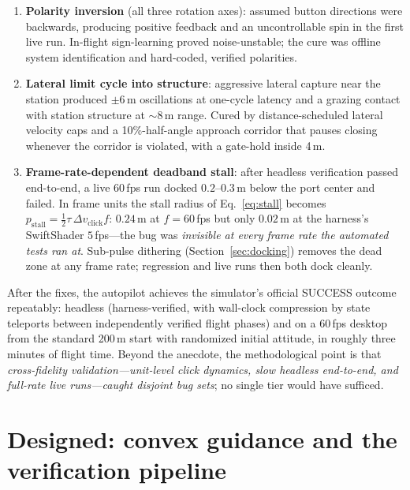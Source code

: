\documentclass[11pt]{article}
\begin{document}
\begin{enumerate}
  \item \textbf{Polarity inversion} (all three rotation axes): assumed
        button directions were backwards, producing positive feedback and
        an uncontrollable spin in the first live run. In-flight
        sign-learning proved noise-unstable; the cure was offline system
        identification and hard-coded, verified polarities.
  \item \textbf{Lateral limit cycle into structure}: aggressive lateral
        capture near the station produced $\pm 6$\,m oscillations at
        one-cycle latency and a grazing contact with station structure at
        $\sim$8\,m range. Cured by distance-scheduled lateral velocity
        caps and a 10\%-half-angle approach corridor that pauses closing
        whenever the corridor is violated, with a gate-hold inside 4\,m.
  \item \textbf{Frame-rate-dependent deadband stall}: after headless
        verification passed end-to-end, a live 60\,fps run docked
        $0.2$--$0.3$\,m below the port center and failed. In frame units
        the stall radius of Eq.~\eqref{eq:stall} becomes
        $p_{\mathrm{stall}} = \tfrac{1}{2}\tau\,\Delta v_{\mathrm{click}} f$:
        $0.24$\,m at $f{=}60$\,fps but only $0.02$\,m at the harness's
        SwiftShader $5$\,fps---the bug was \emph{invisible at every frame
        rate the automated tests ran at}. Sub-pulse dithering
        (Section~\ref{sec:docking}) removes the dead zone at any frame
        rate; regression and live runs then both dock cleanly.
\end{enumerate}

After the fixes, the autopilot achieves the simulator's official SUCCESS
outcome repeatably: headless (harness-verified, with wall-clock compression
by state teleports between independently verified flight phases) and on a
60\,fps desktop from the standard 200\,m start with randomized initial
attitude, in roughly three minutes of flight time. Beyond the anecdote, the
methodological point is that \emph{cross-fidelity validation---unit-level
click dynamics, slow headless end-to-end, and full-rate live runs---caught
disjoint bug sets}; no single tier would have sufficed.

\section{Designed: convex guidance and the verification pipeline}
\label{sec:design}
\end{document}
